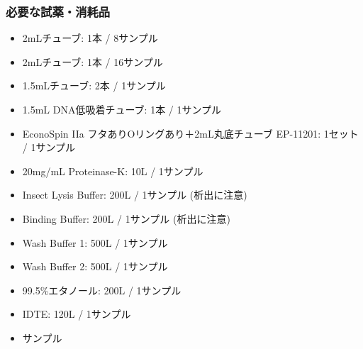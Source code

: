 \documentclass[titlepage,10pt,a4paper]{jsbook}
\begin{document}
\subsubsection{必要な試薬・消耗品}
\begin{itemize}
\item 2mLチューブ: 1本 / 8サンプル
\item 2mLチューブ: 1本 / 16サンプル
\item 1.5mLチューブ: 2本 / 1サンプル
\item 1.5mL DNA低吸着チューブ: 1本 / 1サンプル
\item EconoSpin IIa フタありOリングあり＋2mL丸底チューブ EP-11201: 1セット / 1サンプル
\item 20mg/mL Proteinase-K: 10{\textmu}L / 1サンプル
\item Insect Lysis Buffer: 200{\textmu}L / 1サンプル (析出に注意)
\item Binding Buffer: 200{\textmu}L / 1サンプル (析出に注意)
\item Wash Buffer 1: 500{\textmu}L / 1サンプル
\item Wash Buffer 2: 500{\textmu}L / 1サンプル
\item 99.5\%エタノール: 200{\textmu}L / 1サンプル
\item IDTE: 120{\textmu}L / 1サンプル
\item サンプル
\end{itemize}
\end{document}
